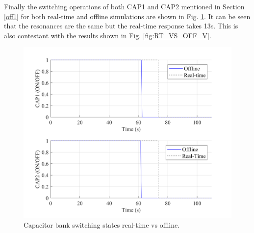Finally the switching operations of both CAP1 and CAP2 mentioned in Section \ref{off1} for both real-time and offline simulations are shown in Fig. \ref{fig:RT_CAP}. It can be seen that the resonances are the same but the real-time response takes 13s. This is also contestant with the results shown in Fig. \ref{fig:RT_VS_OFF_V}.

\begin{figure}[!h]
\centering
\includegraphics[width=\linewidth]{figs/CAPS_RT.PNG}
\caption{Capacitor bank switching states real-time vs offline.}
\label{fig:RT_CAP}
\end{figure}
